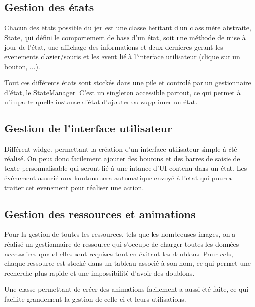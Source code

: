 \documentclass[a4paper]{article}
\newcommand{\alinea}{\hspace*{0.5cm}}
\begin{document}
		\subsection{Gestion des états}
			Chacun des états possible du jeu est une classe héritant d'un class mère abstraite, State, qui défini le comportement de base d'un état, soit une méthode de mise à jour de l'état, une affichage des informations et deux dernieres gerant les evenements clavier/souris et les event lié à l'interface utilisateur (clique sur un bouton, ...).
			
			Tout ces différents états sont stockés dans une pile et controlé par un gestionnaire d'état, le StateManager. C'est un singleton accessible partout, ce qui permet à n'importe quelle instance d'état d'ajouter ou supprimer un état.
		
		\subsection{Gestion de l'interface utilisateur}
			Différent widget permettant la création d'un interface utilisateur simple à été réalisé. On peut donc facilement ajouter des boutons et des barres de saisie de texte personnalisable qui seront lié à une intance d'UI contenu dans un état. Les événement associé aux boutons sera automatique envoyé à l'etat qui pourra traiter cet evenement pour réaliser une action.
		
		\subsection{Gestion des ressources et animations}
			Pour la gestion de toutes les ressources, tels que les nombreuses images, on a réalisé un gestionnaire de ressource qui s'occupe de charger toutes les données necessaires quand elles sont requises tout en évitant les doublons. Pour cela, chaque ressource est stocké dans un tableau associé à son nom, ce qui permet une recherche plus rapide et une impossibilité d'avoir des doublons.
			
			Une classe permettant de créer des animations facilement a aussi été faite, ce qui facilite grandement la gestion de celle-ci et leurs utilisations.

      
\end{document}

